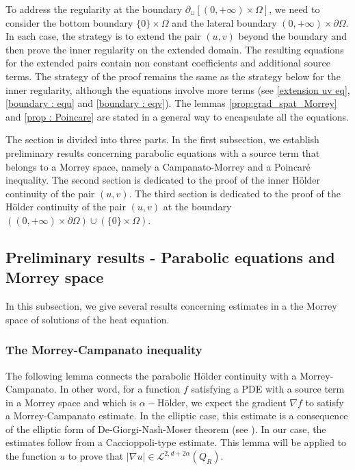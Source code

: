 \documentclass[reqno,12pt,twoside]{amsart}
\numberwithin{equation}{section} \numberwithin{theorem}{section}
\numberwithin{proposition}{section} \numberwithin{lemma}{section}
\numberwithin{corollary}{section}
\numberwithin{definition}{section} \numberwithin{remark}{section}
\begin{document}
\smallskip

To address the regularity at the boundary $\partial_\sqcup [(0,+\infty)\times \Omega]$, we need to consider the bottom boundary $\{0\}\times \Omega$ and the lateral boundary $(0,+\infty) \times \partial \Omega$. In each case, the strategy is to extend the pair $(u,v)$ beyond the boundary and then prove the inner regularity on the extended domain. The resulting equations for the extended pairs contain non constant coefficients and additional source terms. The strategy of the proof remains the same as the strategy below for the inner regularity, although the equations involve more terms (see \eqref{extension uv eq}, \eqref{boundary : equ} and \eqref{boundary : eqv}). The lemmas \autoref{prop:grad_spat_Morrey} and \autoref{prop : Poincare} are stated in a general way to encapsulate all the equations.  

\medskip

% 
The section is divided into three parts. In the first subsection, we establish preliminary results concerning parabolic equations with a source term that belongs to a Morrey space, namely a Campanato-Morrey and a Poincaré inequality. The second section is dedicated to the proof of the inner Hölder continuity of the pair $(u, v)$. The third section is dedicated to the proof of the Hölder continuity of the pair $(u,v)$ at the boundary $((0,+\infty) \times \partial\Omega) \cup (\{0\} \times \Omega)$.  

\medskip  

\subsection{Preliminary results - Parabolic equations and Morrey space}

In this subsection, we give several results concerning estimates in a the Morrey space of solutions of the heat equation.

\smallskip

\subsubsection{The Morrey-Campanato inequality} 
 
The following lemma connects the parabolic Hölder continuity with a Morrey-Campanato. In other word, for a function $f$ satisfying a PDE with a source term in a Morrey space and which is $\alpha-$Hölder, we expect the gradient $\nabla f$ to satisfy a Morrey-Campanato estimate. In the elliptic case, this estimate is a consequence of the elliptic form of De-Giorgi-Nash-Moser theorem (see \cite[Theorem 3.1]{BMRa23}). In our case, the estimates follow from a Caccioppoli-type estimate. This lemma will be applied to the function $u$ to prove that $|\nabla u| \in \mathcal{L}^{2,d+2\alpha}(Q_R)$.      
\end{document}
